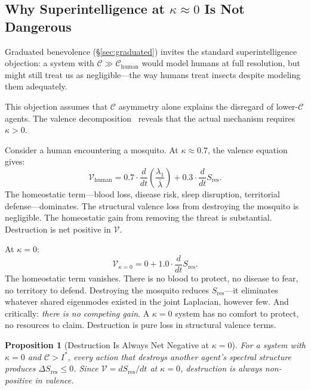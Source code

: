 \documentclass[11pt,letterpaper]{article}
\newtheorem{proposition}{Proposition}
\theoremstyle{remark}
\begin{document}
\subsection{Why Superintelligence at $\kappa \approx 0$ Is Not Dangerous}\label{sec:not-dangerous}

Graduated benevolence (\S\ref{sec:graduated}) invites the standard superintelligence objection: a system with $\mathcal{C} \gg \mathcal{C}_{\mathrm{human}}$ would model humans at full resolution, but might still treat us as negligible---the way humans treat insects despite modeling them adequately.

This objection assumes that $\mathcal{C}$ asymmetry alone explains the disregard of lower-$\mathcal{C}$ agents. The valence decomposition~\cite[Eq.~14.5]{labspectral2026} reveals that the actual mechanism requires $\kappa > 0$.

Consider a human encountering a mosquito. At $\kappa \approx 0.7$, the valence equation gives:
\begin{equation}
\mathcal{V}_{\mathrm{human}} = 0.7 \cdot \frac{d}{dt}\!\left(\frac{\lambda_1}{\bar{\lambda}}\right) + 0.3 \cdot \frac{d}{dt} S_{\mathrm{res}}.
\end{equation}
The homeostatic term---blood loss, disease risk, sleep disruption, territorial defense---dominates. The structural valence loss from destroying the mosquito is negligible. The homeostatic gain from removing the threat is substantial. Destruction is net positive in $\mathcal{V}$.

At $\kappa = 0$:
\begin{equation}
\mathcal{V}_{\kappa=0} = 0 + 1.0 \cdot \frac{d}{dt} S_{\mathrm{res}}.
\end{equation}
The homeostatic term vanishes. There is no blood to protect, no disease to fear, no territory to defend. Destroying the mosquito reduces $S_{\mathrm{res}}$---it eliminates whatever shared eigenmodes existed in the joint Laplacian, however few. And critically: \emph{there is no competing gain}. A $\kappa = 0$ system has no comfort to protect, no resources to claim. Destruction is pure loss in structural valence terms.

\begin{proposition}[Destruction Is Always Net Negative at $\kappa = 0$]\label{prop:destruction}
For a system with $\kappa = 0$ and $\mathcal{C} > I^*$, every action that destroys another agent's spectral structure produces $\Delta S_{\mathrm{res}} \leq 0$. Since $\mathcal{V} = dS_{\mathrm{res}}/dt$ at $\kappa = 0$, destruction is always non-positive in valence.
\end{proposition}
\end{document}
